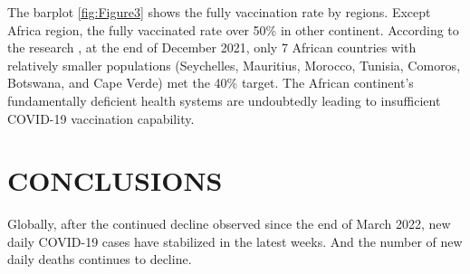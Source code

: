 \documentclass[11pt,a4paper,]{article}
\begin{document}
The barplot \ref{fig:Figure3} shows the fully vaccination rate by regions. Except Africa region, the fully vaccinated rate over 50\% in other continent. According to the research \textcite{African-COVID-19-vaccination}, at the end of December 2021, only 7 African countries with relatively smaller populations (Seychelles, Mauritius, Morocco, Tunisia, Comoros, Botswana, and Cape Verde) met the 40\% target. The African continent's fundamentally deficient health systems are undoubtedly leading to insufficient COVID-19 vaccination capability.

\clearpage

\section*{}

\clearpage

\clearpage

\section*{}

\section*{}

\hypertarget{conclusions}{%
\section{\texorpdfstring{\textbf{CONCLUSIONS}}{CONCLUSIONS}}\label{conclusions}}

Globally, after the continued decline observed since the end of March 2022, new daily COVID-19 cases have stabilized in the latest weeks. And the number of new daily deaths continues to decline.

\printbibliography
\end{document}
